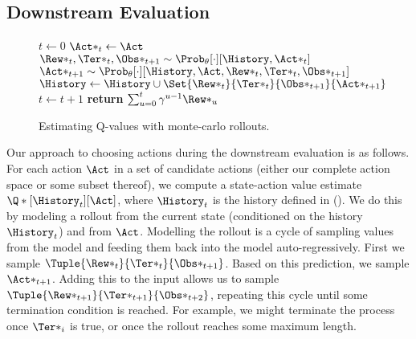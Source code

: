 \subsection{Downstream Evaluation}
\begin{figure}[tb]
    \begin{algorithm}[H]
        \caption{Estimating Q-values with monte-carlo rollouts.}
        \begin{algorithmic}[1]
            \State $t \gets 0$
            \State $\Act*_{t} \gets \Act$
            \State $\Rew*_{t},\Ter*_{t},\Obs*_{t+1} \sim \Prob_\theta[\cdot][\History, \Act*_{t}]$
            \State $\Act*_{t+1} \sim \Prob_\theta[\cdot][\History, \Act, \Rew*_{t}, \Ter*_{t},
                    \Obs*_{t+1}]$
            \State $\History \gets \History \cup \Set {\Rew*_{t}}{\Ter*_{t}}{\Obs*_{t+1}}{\Act*_{t+1}}$
            \State $t \gets t+1$ 
            \EndWhile
            \State \textbf{return} $\sum_{u=0}^{t} \gamma^{u - 1} \Rew*_u$
            \EndFunction
        \end{algorithmic}
    \end{algorithm}
\end{figure}
Our approach to choosing actions during the downstream evaluation is as follows.
For each action $\Act$ in a set of candidate actions (either our complete action
space or some subset thereof), we compute a state-action value estimate
$\Q*[\History_t][\Act]$, where $\History_t$ is the history defined in
(). We do this by modeling a rollout from the current state
(conditioned on the history $\History_t$) and from $\Act$. Modelling the
rollout is a cycle of sampling values from the model and feeding them back into
the model auto-regressively. First we sample
$\Tuple{\Rew*_t}{\Ter*_t}{\Obs*_{t+1}}$. Based on this prediction, we sample
$\Act*_{t+1}$. Adding this to the input allows us to sample
$\Tuple{\Rew*_{t+1}}{\Ter*_{t+1}}{\Obs*_{t+2}}$, repeating this cycle until some
termination condition is reached. For example, we might terminate the process
once $\Ter*_{i}$ is true, or once the rollout reaches some maximum length.

